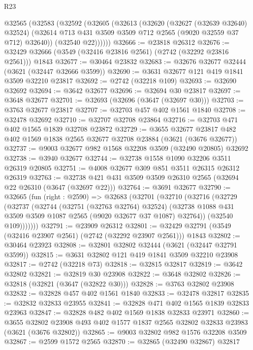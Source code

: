 \begin{lexlean}{R23}
\begin{coremodule}
    @32565
      (@32583
        (@32592
          (@32605
            (@32613
              (@32620
                (@32627 (@32639 @32640) @32524)
                (@32614 @713 @431 @3509 @3509 @712 @2565 (@9020 @32559 @37 @712) @32640))
              (@32540 @22))))))
@32666 := @23818 @26312
@32676 := @32429 @32666 (@3549 (@32416 @23816 @2561) (@2742 (@32292 @23816 @2561))) @1843
@32677 := @30464 @23832
@32683 := @32676 @32677 @32444 (@3621 (@32447 @32666 @3599))
@32690 := @3631 @32677 @121 @419 @1841 @3509 @32210 @23817
@32692 := @2742 (@32218 @109)
@32693 := @32690 @32692
@32694 := @3642 @32677
@32696 := @32694 @30 @23817
@32697 := @3648 @32677
@32701 := @32693 (@32696 (@3647 (@32697 @30)))
@32703 := @3763 @32677 @23817
@32707 := @32703 @457 @402 @1561 @1840
@32708 := @32478 @32692
@32710 := @32707 @32708 @23864
@32716 := @32703 @471 @402 @1565 @1839 @32708 @23872
@32729 := @3655
    @32677
    @23817
    @482
    @402
    @1569
    @1838
    @2565
    @32677
    @32708
    @23884
    (@3621 (@3676 @32677))
@32737 := @9003 @32677 @982 @1568 @32208 @3509 (@32490 @20805) @32692
@32738 := @3940 @32677
@32744 := @32738 @1558 @1090 @32206 @3511 @26319 @20805
@32751 := @4008 @32677 @309 @851 @3511 @26315 @26312 @26319
@32763 := @32738 @421 @431 @3509 @3509 @26310 @2565 (@32694 @22 @26310 (@3647 (@32697 @22)))
@32764 := @3691 @32677
@32790 := @32665
    (fun (right : @2590) =>
    @32683
      (@32701
        (@32710
          (@32716
            (@32729
              (@32737
                (@32744
                  (@32751 (@32763 @32764) @32524)
                  (@32738 @1088 @431 @3509 @3509 @1087 @2565 (@9020 @32677 @37 @1087) @32764))
                (@32540 @109)))))))
@32791 := @23909 @26312
@32801 := @32429 @32791 (@3549 (@32416 @23907 @2561) (@2742 (@32292 @23907 @2561))) @1843
@32802 := @30464 @23923
@32808 := @32801 @32802 @32444 (@3621 (@32447 @32791 @3599))
@32815 := @3631 @32802 @121 @419 @1841 @3509 @32210 @23908
@32817 := @2742 (@32218 @73)
@32818 := @32815 @32817
@32819 := @3642 @32802
@32821 := @32819 @30 @23908
@32822 := @3648 @32802
@32826 := @32818 (@32821 (@3647 (@32822 @30)))
@32828 := @3763 @32802 @23908
@32832 := @32828 @457 @402 @1561 @1840
@32833 := @32478 @32817
@32835 := @32832 @32833 @23955
@32841 := @32828 @471 @402 @1565 @1839 @32833 @23963
@32847 := @32828 @482 @402 @1569 @1838 @32833 @23971
@32860 := @3655
    @32802
    @23908
    @493
    @402
    @1577
    @1837
    @2565
    @32802
    @32833
    @23983
    (@3621 (@3676 @32802))
@32865 := @9003 @32802 @982 @1576 @32208 @3509
@32867 := @2599 @1572 @2565
@32870 := @32865 (@32490 @32867) @32817

\end{coremodule}
\end{lexlean}
